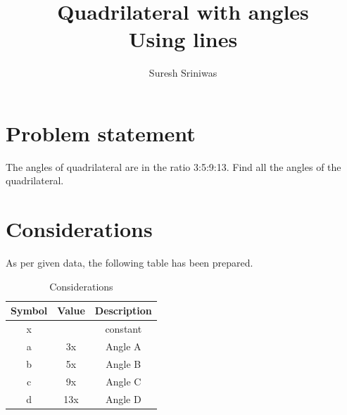 \documentclass[journal,10pt,twocolumn]{article}
\begin{document}

\let\vec\mathbf


\title{
{Quadrilateral with angles \\
Using lines}\\
}
\author{Suresh Sriniwas}
\maketitle
\tableofcontents
\section{Problem statement}
\begin{flushleft}
The angles of quadrilateral are in the ratio 3:5:9:13. Find all the angles of the quadrilateral.\\
\end{flushleft}

\section{Considerations}
\vspace{0.2cm}
\begin{flushleft}
As per given data, the following table has been prepared.\\
\end{flushleft}
\vspace{0.3cm}
\begin{table}[htbp]
    \centering
\setlength\extrarowheight{2pt}
\begin{tabular}{|c|c|c|} \hline
      \textbf{Symbol}           &   \textbf{Value}   & \textbf{Description}\\ \hline
	x &  & constant\\  \hline
	a & 3x & Angle A\\ \hline
	b & 5x & Angle B\\ \hline
    c & 9x & Angle C \\ \hline
    d & 13x & Angle D \\ \hline
\end{tabular}
\caption{\label{tab:widgets}Considerations}
\end{table}
\end{document}
